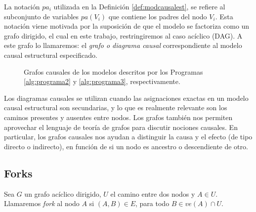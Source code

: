 \documentclass[oneside,openright,titlepage,numbers=noenddot,openany,headinclude,footinclude=true,
cleardoublepage=empty,abstractoff,BCOR=5mm,paper=a4,fontsize=12pt,main=spanish]{scrreprt}
\begin{document}
La notación $pa_i$ utilizada en la Definición \ref{def:modcausalest}, se refiere al subconjunto de variables $pa(V_i)$ que contiene los padres del nodo $V_i$. Esta notación viene motivada por la suposición de que el modelo se factoriza como un grafo dirigido, el cual en este trabajo, restringiremos al caso acíclico (DAG). A este grafo lo llamaremos: el \textit{grafo o diagrama causal} correspondiente al modelo causal estructural especificado.\\

\begin{figure}[h]
\centering
{}
\caption{Grafos causales de los modelos descritos por los Programas \ref{alg:programa2} y \ref{alg:programa3}, respectivamente.}
\end{figure}

Los diagramas causales se utilizan cuando las asignaciones exactas en un modelo causal estructural son secundarias, y lo que es realmente relevante son los caminos presentes y ausentes entre nodos. Los grafos también nos permiten aprovechar el lenguaje de teoría de grafos para discutir nociones causales. En particular, los grafos causales nos ayudan a distinguir la causa y el efecto (de tipo directo o indirecto), en función de si un nodo es ancestro o descendiente de otro.

\subsection{Forks}

\begin{definition} 
Sea $G$ un grafo acíclico dirigido, $U$ el camino entre dos nodos y $A\in U$. Llamaremos \textit{fork} al nodo $A$ si $(A,B)\in E$, para todo $B\in ve(A) \cap U$.
\end{definition}\
\end{document}
